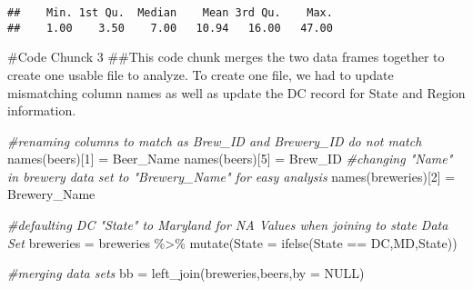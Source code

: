 \documentclass[
]{article}
\newenvironment{Shaded}{\begin{snugshade}}{\end{snugshade}}
\newcommand{\AttributeTok}[1]{\textcolor[rgb]{0.77,0.63,0.00}{#1}}
\newcommand{\CommentTok}[1]{\textcolor[rgb]{0.56,0.35,0.01}{\textit{#1}}}
\newcommand{\ConstantTok}[1]{\textcolor[rgb]{0.00,0.00,0.00}{#1}}
\newcommand{\DecValTok}[1]{\textcolor[rgb]{0.00,0.00,0.81}{#1}}
\newcommand{\FunctionTok}[1]{\textcolor[rgb]{0.00,0.00,0.00}{#1}}
\newcommand{\NormalTok}[1]{#1}
\newcommand{\OtherTok}[1]{\textcolor[rgb]{0.56,0.35,0.01}{#1}}
\newcommand{\SpecialCharTok}[1]{\textcolor[rgb]{0.00,0.00,0.00}{#1}}
\newcommand{\StringTok}[1]{\textcolor[rgb]{0.31,0.60,0.02}{#1}}
\begin{document}
\begin{Shaded}
\end{Shaded}

\begin{verbatim}
##    Min. 1st Qu.  Median    Mean 3rd Qu.    Max. 
##    1.00    3.50    7.00   10.94   16.00   47.00
\end{verbatim}

\#Code Chunck 3 \#\#This code chunk merges the two data frames together
to create one usable file to analyze. To create one file, we had to
update mismatching column names as well as update the DC record for
State and Region information.

\begin{Shaded}
\begin{Highlighting}[]
\CommentTok{\#renaming columns to match as Brew\_ID and Brewery\_ID do not match}
\FunctionTok{names}\NormalTok{(beers)[}\DecValTok{1}\NormalTok{] }\OtherTok{=} \StringTok{\textquotesingle{}Beer\_Name\textquotesingle{}}
\FunctionTok{names}\NormalTok{(beers)[}\DecValTok{5}\NormalTok{] }\OtherTok{=} \StringTok{\textquotesingle{}Brew\_ID\textquotesingle{}}
\CommentTok{\#changing "Name" in brewery data set to "Brewery\_Name" for easy analysis}
\FunctionTok{names}\NormalTok{(breweries)[}\DecValTok{2}\NormalTok{] }\OtherTok{=} \StringTok{\textquotesingle{}Brewery\_Name\textquotesingle{}}

\CommentTok{\#defaulting DC "State" to Maryland for NA Values when joining to state Data Set}
\NormalTok{breweries }\OtherTok{=}\NormalTok{ breweries }\SpecialCharTok{\%\textgreater{}\%}
   \FunctionTok{mutate}\NormalTok{(}\AttributeTok{State =} \FunctionTok{ifelse}\NormalTok{(State }\SpecialCharTok{==} \StringTok{\textquotesingle{}DC\textquotesingle{}}\NormalTok{,}\StringTok{\textquotesingle{}MD\textquotesingle{}}\NormalTok{,State))}

\CommentTok{\#merging data sets}
\NormalTok{bb }\OtherTok{=} \FunctionTok{left\_join}\NormalTok{(breweries,beers,}\AttributeTok{by =} \ConstantTok{NULL}\NormalTok{)}
\end{Highlighting}
\end{Shaded}
\end{document}
